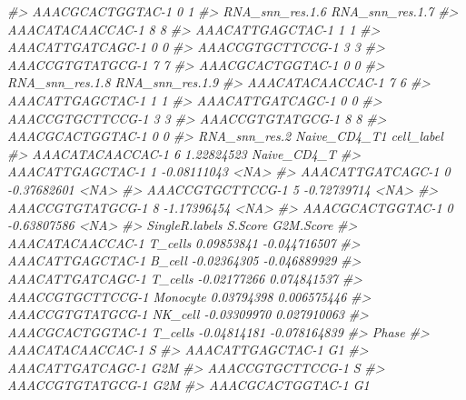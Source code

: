 \documentclass[
]{book}
\newenvironment{Shaded}{\begin{snugshade}}{\end{snugshade}}
\newcommand{\CommentTok}[1]{\textcolor[rgb]{0.56,0.35,0.01}{\textit{#1}}}
\begin{document}
\begin{Shaded}
\begin{Highlighting}[]
\CommentTok{\#\textgreater{} AAACGCACTGGTAC{-}1               0               1}
\CommentTok{\#\textgreater{}                  RNA\_snn\_res.1.6 RNA\_snn\_res.1.7}
\CommentTok{\#\textgreater{} AAACATACAACCAC{-}1               8               8}
\CommentTok{\#\textgreater{} AAACATTGAGCTAC{-}1               1               1}
\CommentTok{\#\textgreater{} AAACATTGATCAGC{-}1               0               0}
\CommentTok{\#\textgreater{} AAACCGTGCTTCCG{-}1               3               3}
\CommentTok{\#\textgreater{} AAACCGTGTATGCG{-}1               7               7}
\CommentTok{\#\textgreater{} AAACGCACTGGTAC{-}1               0               0}
\CommentTok{\#\textgreater{}                  RNA\_snn\_res.1.8 RNA\_snn\_res.1.9}
\CommentTok{\#\textgreater{} AAACATACAACCAC{-}1               7               6}
\CommentTok{\#\textgreater{} AAACATTGAGCTAC{-}1               1               1}
\CommentTok{\#\textgreater{} AAACATTGATCAGC{-}1               0               0}
\CommentTok{\#\textgreater{} AAACCGTGCTTCCG{-}1               3               3}
\CommentTok{\#\textgreater{} AAACCGTGTATGCG{-}1               8               8}
\CommentTok{\#\textgreater{} AAACGCACTGGTAC{-}1               0               0}
\CommentTok{\#\textgreater{}                  RNA\_snn\_res.2 Naive\_CD4\_T1  cell\_label}
\CommentTok{\#\textgreater{} AAACATACAACCAC{-}1             6   1.22824523 Naive\_CD4\_T}
\CommentTok{\#\textgreater{} AAACATTGAGCTAC{-}1             1  {-}0.08111043        \textless{}NA\textgreater{}}
\CommentTok{\#\textgreater{} AAACATTGATCAGC{-}1             0  {-}0.37682601        \textless{}NA\textgreater{}}
\CommentTok{\#\textgreater{} AAACCGTGCTTCCG{-}1             5  {-}0.72739714        \textless{}NA\textgreater{}}
\CommentTok{\#\textgreater{} AAACCGTGTATGCG{-}1             8  {-}1.17396454        \textless{}NA\textgreater{}}
\CommentTok{\#\textgreater{} AAACGCACTGGTAC{-}1             0  {-}0.63807586        \textless{}NA\textgreater{}}
\CommentTok{\#\textgreater{}                  SingleR.labels     S.Score    G2M.Score}
\CommentTok{\#\textgreater{} AAACATACAACCAC{-}1        T\_cells  0.09853841 {-}0.044716507}
\CommentTok{\#\textgreater{} AAACATTGAGCTAC{-}1         B\_cell {-}0.02364305 {-}0.046889929}
\CommentTok{\#\textgreater{} AAACATTGATCAGC{-}1        T\_cells {-}0.02177266  0.074841537}
\CommentTok{\#\textgreater{} AAACCGTGCTTCCG{-}1       Monocyte  0.03794398  0.006575446}
\CommentTok{\#\textgreater{} AAACCGTGTATGCG{-}1        NK\_cell {-}0.03309970  0.027910063}
\CommentTok{\#\textgreater{} AAACGCACTGGTAC{-}1        T\_cells {-}0.04814181 {-}0.078164839}
\CommentTok{\#\textgreater{}                  Phase}
\CommentTok{\#\textgreater{} AAACATACAACCAC{-}1     S}
\CommentTok{\#\textgreater{} AAACATTGAGCTAC{-}1    G1}
\CommentTok{\#\textgreater{} AAACATTGATCAGC{-}1   G2M}
\CommentTok{\#\textgreater{} AAACCGTGCTTCCG{-}1     S}
\CommentTok{\#\textgreater{} AAACCGTGTATGCG{-}1   G2M}
\CommentTok{\#\textgreater{} AAACGCACTGGTAC{-}1    G1}
\end{Highlighting}
\end{Shaded}
\end{document}
